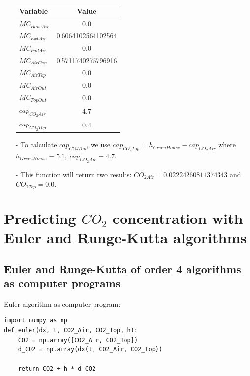 \documentclass[a4paper]{article}
\numberwithin{equation}{section}
\begin{document}
\begin{itemize}
        \begin{table}[H]
          \centering
          \begin{tabular}{@{}lS[table-format=1.17]@{}}
            \toprule
            \textbf{Variable} & \textbf{Value}     \\
            \midrule
            \(MC_{BlowAir}\)  & 0.0                \\
            \(MC_{ExtAir}\)   & 0.6064102564102564 \\
            \(MC_{PadAir}\)   & 0.0                \\
            \(MC_{AirCan}\)   & 0.5711740275796916 \\
            \(MC_{AirTop}\)   & 0.0                \\
            \(MC_{AirOut}\)   & 0.0                \\
            \(MC_{TopOut}\)   & 0.0                \\
            \(cap_{CO_2Air}\) & 4.7                \\
            \(cap_{CO_2Top}\) & 0.4                \\
            \bottomrule
          \end{tabular}
        \end{table}
  \item[-] To calculate \(cap_{CO_2Top}\), we use \(cap_{CO_2Top} = h_{GreenHouse} - cap_{CO_2Air}\) where \(h_{GreenHouse} = 5.1,\ cap_{CO_2Air} = 4.7\).
  \item[-] This function will return two results: \(\dot{CO_{2Air}} = 0.02224260811374343\) and \(\dot{CO_{2Top}} = 0.0\).
\end{itemize}


\newpage
\section{Predicting \texorpdfstring{\(CO_2\)}{} concentration with Euler and Runge-Kutta algorithms}
\subsection{Euler and Runge-Kutta of order 4 algorithms as computer programs}
Euler algorithm as computer program:
\begin{mdframed}[leftline=false,rightline=false,backgroundcolor=magenta!10,nobreak=true]
  \begin{verbatim}
import numpy as np
def euler(dx, t, CO2_Air, CO2_Top, h):
    CO2 = np.array([CO2_Air, CO2_Top])
    d_CO2 = np.array(dx(t, CO2_Air, CO2_Top))

    return CO2 + h * d_CO2
  \end{verbatim}
\end{mdframed}
\end{document}
